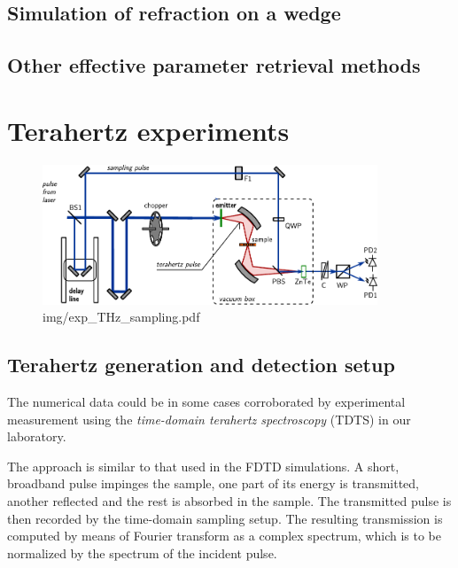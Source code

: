 \subsection{Simulation of refraction on a wedge} %
\subsection{Other effective parameter retrieval methods} %





\section{Terahertz experiments} %
\begin{figure} \caption{img/exp\_THz\_sampling.pdf}  \centering \includegraphics[width=10cm]{img/exp_THz_sampling.pdf} \end{figure} \clearpage
\subsection{Terahertz generation and detection setup}%
The numerical data could be in some cases corroborated by experimental measurement using the \textit{time-domain terahertz spectroscopy} (TDTS) in our laboratory. 

The approach is similar to that used in the FDTD simulations. A short, broadband pulse impinges the sample, one part of its energy is transmitted, another reflected and the rest is absorbed in the sample. The transmitted pulse is then recorded by the time-domain sampling setup. The resulting transmission is computed by means of Fourier transform as a complex spectrum, which is to be normalized by the spectrum of the incident pulse.

